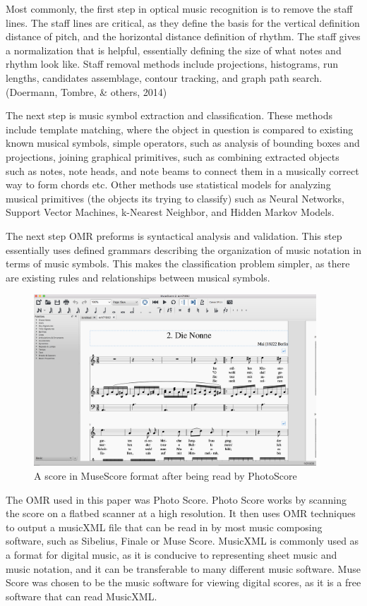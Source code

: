 \documentclass[12pt,twoside]{reedthesis}
\theoremstyle{definition}
\theoremstyle{definition}
\theoremstyle{definition}
\theoremstyle{remark}
\begin{document}
Most commonly, the first step in optical music recognition is to remove
the staff lines. The staff lines are critical, as they define the basis
for the vertical definition distance of pitch, and the horizontal
distance definition of rhythm. The staff gives a normalization that is
helpful, essentially defining the size of what notes and rhythm look
like. Staff removal methods include projections, histograms, run
lengths, candidates assemblage, contour tracking, and graph path search.
(Doermann, Tombre, \& others, 2014)

The next step is music symbol extraction and classification. These
methods include template matching, where the object in question is
compared to existing known musical symbols, simple operators, such as
analysis of bounding boxes and projections, joining graphical
primitives, such as combining extracted objects such as notes, note
heads, and note beams to connect them in a musically correct way to form
chords etc. Other methods use statistical models for analyzing musical
primitives (the objects its trying to classify) such as Neural Networks,
Support Vector Machines, k-Nearest Neighbor, and Hidden Markov Models.

The next step OMR preforms is syntactical analysis and validation. This
step essentially uses defined grammars describing the organization of
music notation in terms of music symbols. This makes the classification
problem simpler, as there are existing rules and relationships between
musical symbols.
\begin{Shaded}
\begin{Highlighting}[]
\OperatorTok{::}\NormalTok{(}\NormalTok{)}
\end{Highlighting}
\end{Shaded}
\begin{figure}
\includegraphics[width=400px]{images/museScore} \caption{A score in MuseScore format after being read by PhotoScore}\label{fig:unnamed-chunk-2}
\end{figure}
The OMR used in this paper was Photo Score. Photo Score works by
scanning the score on a flatbed scanner at a high resolution. It then
uses OMR techniques to output a musicXML file that can be read in by
most music composing software, such as Sibelius, Finale or Muse Score.
MusicXML is commonly used as a format for digital music, as it is
conducive to representing sheet music and music notation, and it can be
transferable to many different music software. Muse Score was chosen to
be the music software for viewing digital scores, as it is a free
software that can read MusicXML.
\end{document}
